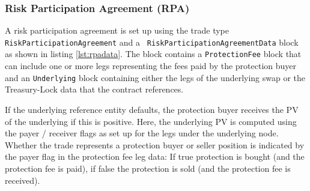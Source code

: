 \subsubsection{Risk Participation Agreement (RPA)}
\label{input:cr_rpa}

\ifdefined{}\fi

A risk participation agreement is set up using the trade type {\tt RiskParticipationAgreement} and a {\tt
 RiskParticipationAgreementData} block as shown in listing \ref{lst:rpadata}. The block contains a {\tt ProtectionFee}
block that can include one or more legs representing the fees paid by the protection buyer and an {\tt Underlying} block
containing either the legs of the underlying swap or the Treasury-Lock data that the contract references.

If the underlying reference entity defaults, the protection buyer receives the PV of the underlying if this is
positive. Here, the underlying PV is computed using the payer / receiver flags as set up for the legs under the
underlying node. Whether the trade represents a protection buyer or seller position is indicated by the payer flag in
the protection fee leg data: If true protection is bought (and the protection fee is paid), if false the protection is
sold (and the protection fee is received).

